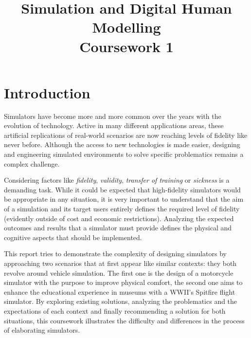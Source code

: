 \documentclass[authoryear,preprint]{sigplanconf}
\begin{document}
\setlength{\pdfpageheight}{\paperheight}
\setlength{\pdfpagewidth}{\paperwidth}


\title{Simulation and Digital Human Modelling\\Coursework 1}


\maketitle

\section{Introduction}

Simulators have become more and more common over the years with the evolution of technology. Active in many different applications areas, these artificial replications of real-world scenarios are now reaching levels of fidelity like never before. Although the access to new technologies is made easier, designing and engineering simulated environments to solve specific problematics remains a complex challenge.

Considering factors like \textit{fidelity}, \textit{validity}, \textit{transfer of training} or \textit{sickness} is a demanding task. While it could be expected that high-fidelity simulators would be appropriate in any situation, it is very important to understand that the aim of a simulation and its target users entirely defines the required level of fidelity (evidently outside of cost and economic restrictions). Analyzing the expected outcomes and results that a simulator must provide defines the physical and cognitive aspects that should be implemented.

This report tries to demonstrate the complexity of designing simulators by approaching two scenarios that at first appear like similar contexts: they both revolve around vehicle simulation. The first one is the design of a motorcycle simulator with the purpose to improve physical comfort, the second one aims to enhance the educational experience in museums with a WWII's Spitfire flight simulator. By exploring existing solutions, analyzing the problematics and the expectations of each context and finally recommending a solution for both situations, this coursework illustrates the difficulty and differences in the process of   elaborating simulators.
\end{document}
